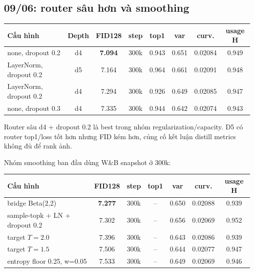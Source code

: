 \documentclass[11pt,a4paper]{article}
\newcommand{\best}[1]{\textbf{#1}}
\newcommand{\na}{--}
\begin{document}
\subsection{09/06: router sâu hơn và smoothing}

\begin{center}
\small
\setlength{\tabcolsep}{2.5pt}
\begin{tabularx}{\linewidth}{@{}Y c c c c c c c@{}}
\toprule
\textbf{Cấu hình} & \textbf{Depth} & \textbf{FID128} & \textbf{step} & \textbf{top1} & \textbf{var} & \textbf{curv.} & \textbf{usage H}\\
\midrule
none, dropout 0.2 & d4 & \best{7.094} & 300k & 0.943 & 0.651 & 0.02084 & 0.949\\
LayerNorm, dropout 0.2 & d5 & 7.164 & 300k & 0.964 & 0.661 & 0.02091 & 0.948\\
LayerNorm, dropout 0.2 & d4 & 7.294 & 300k & 0.926 & 0.649 & 0.02085 & 0.947\\
none, dropout 0.3 & d4 & 7.335 & 300k & 0.944 & 0.642 & 0.02074 & 0.943\\
\bottomrule
\end{tabularx}
\end{center}

Router sâu d4 + dropout 0.2 là best trong nhóm regularization/capacity. D5 có router top1/loss tốt hơn nhưng FID kém hơn, củng cố kết luận distill metrics không đủ để rank ảnh.

Nhóm smoothing ban đầu dùng W\&B snapshot ở 300k:
\begin{center}
\small
\setlength{\tabcolsep}{3pt}
\begin{tabularx}{\linewidth}{@{}Y c c c c c c@{}}
\toprule
\textbf{Cấu hình} & \textbf{FID128} & \textbf{step} & \textbf{top1} & \textbf{var} & \textbf{curv.} & \textbf{usage H}\\
\midrule
bridge Beta(2,2) & \best{7.277} & 300k & \na{} & 0.650 & 0.02088 & 0.939\\
sample-topk + LN + dropout 0.2 & 7.302 & 300k & \na{} & 0.656 & 0.02069 & 0.952\\
target \(T=2.0\) & 7.396 & 300k & \na{} & 0.643 & 0.02086 & 0.939\\
target \(T=1.5\) & 7.506 & 300k & \na{} & 0.644 & 0.02077 & 0.947\\
entropy floor 0.25, w=0.05 & 7.533 & 300k & \na{} & 0.649 & 0.02069 & 0.946\\
\bottomrule
\end{tabularx}
\end{center}
\end{document}
